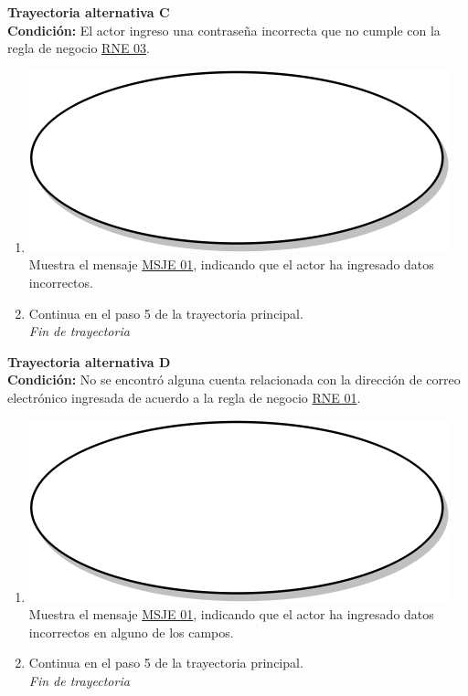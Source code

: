 \textbf{Trayectoria alternativa C} \label{cu1_ta_c}\\
\textbf{Condición:} El actor ingreso una contraseña incorrecta que no cumple con la regla de negocio \hyperref[rne_03]{RNE 03}.\\
 \begin{enumerate}[label=C\arabic*]
    \item {\includegraphics[scale=.05]{Capitulo3/img/proceso.png} Muestra el mensaje \hyperref[msje_01]{MSJE 01}, indicando que el actor ha ingresado datos incorrectos.}
    \item {Continua en el paso 5 de la trayectoria principal.} \\
    \textit{Fin de trayectoria} \\
\end{enumerate}

\textbf{Trayectoria alternativa D} \label{cu1_ta_d}\\
\textbf{Condición:} No se encontró alguna cuenta relacionada con la dirección de correo electrónico ingresada de acuerdo a la regla de negocio \hyperref[rne_01]{RNE 01}.\\
 \begin{enumerate}[label=D\arabic*]
    \item {\includegraphics[scale=.05]{Capitulo3/img/proceso.png} Muestra el mensaje \hyperref[msje_01]{MSJE 01}, indicando que el actor ha ingresado datos incorrectos en alguno de los campos.}
    \item {Continua en el paso 5 de la trayectoria principal.} \\
    \textit{Fin de trayectoria} \\
\end{enumerate}

